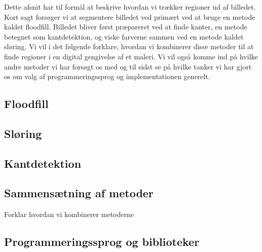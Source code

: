 {
{\sffamily Dette afsnit har til formål at beskrive hvordan vi trækker
regioner ud af billedet. Kort sagt forsøger vi at segmentere billedet
ved primært ved at bruge en metode kaldet floodfill. Billedet bliver
først præpareret ved at finde kanter, en metode betegnet som
kantdetektion, og viske farverne sammen ved en metode kaldet sløring. Vi
vil i det følgende forklare, hvordan vi kombinerer disse metoder til at
finde regioner i en digital gengivelse af et maleri. Vi vil også komme
ind på hvilke andre metoder vi har forsøgt os med og til sidst se på
hvilke tanker vi har gjort os om valg af programmeringssprog og
implementationen generelt.
}

\subsection{Floodfill\label{subsec_floodfill}}                                  %


\subsection{Sløring}                                    %


\subsection{Kantdetektion}                              %


\subsection{Sammensætning af metoder}
Forklar hvordan vi kombinerer metoderne

\subsection{Programmeringssprog og biblioteker}


}

